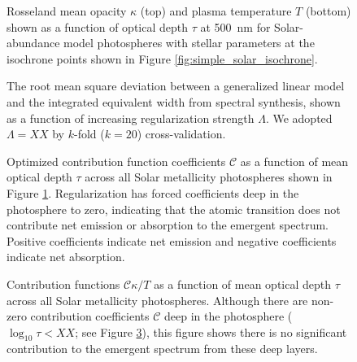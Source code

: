 \documentclass{aastex61}
\begin{document}
\begin{figure}
	\caption{
		Rosseland mean opacity $\kappa$ (top) and plasma temperature $T$ 
		(bottom) shown as a function of optical depth $\tau$ at 500~nm
		for Solar-abundance model photospheres with stellar parameters
		at the isochrone points shown in Figure \ref{fig:simple_solar_isochrone}.
		\label{fig:simple_photospheric_properties}}
\end{figure}


\begin{figure}
	\caption{
		The root mean square deviation between a generalized linear model
		and the integrated equivalent width from spectral synthesis,
		shown as a function of increasing regularization strength $\Lambda$.
		We adopted $\Lambda = XX$ by $k$-fold ($k=20$) cross-validation.
		\label{fig:simple_regularization_performance}}
\end{figure}


\begin{figure}
	\caption{
		Optimized contribution function coefficients $\mathcal{C}$ as a 
		function of mean optical depth $\tau$ across all Solar metallicity 
		photospheres shown in Figure \ref{fig:simple_photospheric_properties}.
		Regularization has forced coefficients deep in the photosphere to
		zero, indicating that the atomic transition does not contribute net
		emission or absorption to the emergent spectrum.
		Positive coefficients indicate net emission and negative coefficients
		indicate net absorption.
		\label{fig:simple_photospheric_coefficients}}
\end{figure}


\begin{figure}
	\caption{
		Contribution functions $\mathcal{C}\kappa/T$ as a function of mean
		optical depth $\tau$ across all Solar metallicity photospheres.
		Although there are non-zero contribution coefficients $\mathcal{C}$
		deep in the photosphere ($\log_{10}\tau < XX$; see Figure
		\ref{fig:simple_photospheric_coefficients}), this figure shows
		there is no significant contribution to the emergent spectrum from
		these deep layers.
		\label{fig:simple_photospheric_contributions}}
\end{figure}
\end{document}
